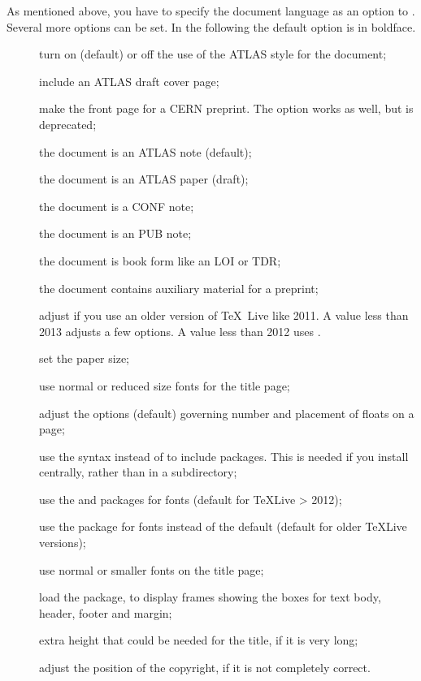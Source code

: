 As mentioned above, you have to specify the document language as an option to .
Several more options can be set.
In the following the default option is in boldface.
\begin{description}
\item[] turn on (default) or off the use of the ATLAS style for the document;
\item[] include an ATLAS draft cover page;
\item[] make the front page for a CERN preprint.
  The option  works as well, but is deprecated;
\item[] the document is an ATLAS note (default);
\item[] the document is an ATLAS paper (draft);
\item[] the document is a CONF note;
\item[] the document is an PUB note;
\item[] the document is book form like an LOI or TDR;
\item[] the document contains auxiliary material for a preprint;
\item[] adjust if you use an older version of \TeX\ Live like 2011.
  A value less than 2013 adjusts a few  options.
  A value less than 2012 uses .
\item[] set the paper size;
\item[] use normal or reduced size fonts for the title page;
\item[] adjust the options (default) governing number and placement of floats on a page;
\item[] use the syntax 
  instead of  to include packages.
  This is needed if you install  centrally,
  rather than in a  subdirectory;
\item[] use the  and  packages for fonts 
  (default for \TeX Live > 2012);
\item[] use the  package for fonts instead of the default
  (default for older \TeX Live versions);
\item[] use normal or smaller fonts on the title page;
\item[] load the  package, to display frames showing the boxes for text body, header, footer and margin;
\item[] extra height that could be needed for the title, if it is very long;
\item[] adjust the position of the copyright,
  if it is not completely correct.
\end{description}

